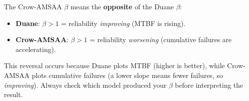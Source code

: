 \documentclass[
  letterpaper,
  DIV=11,
  numbers=noendperiod]{scrreprt}
\providecommand{\tightlist}{%
  \setlength{\itemsep}{0pt}\setlength{\parskip}{0pt}}
\begin{document}
\begin{tcolorbox}[enhanced jigsaw, arc=.35mm, bottomrule=.15mm, bottomtitle=1mm, breakable, colback=white, colbacktitle=quarto-callout-warning-color!10!white, colframe=quarto-callout-warning-color-frame, coltitle=black, left=2mm, leftrule=.75mm, opacityback=0, opacitybacktitle=0.6, rightrule=.15mm, title=\textcolor{quarto-callout-warning-color}{\faExclamationTriangle}\hspace{0.5em}{β Interpretation is Reversed Between Models}, titlerule=0mm, toprule=.15mm, toptitle=1mm]

The Crow-AMSAA \(\beta\) means the \textbf{opposite} of the Duane
\(\beta\):

\begin{itemize}
\tightlist
\item
  \textbf{Duane}: \(\beta > 1\) = reliability \emph{improving} (MTBF is
  rising).
\item
  \textbf{Crow-AMSAA}: \(\beta > 1\) = reliability \emph{worsening}
  (cumulative failures are accelerating).
\end{itemize}

This reversal occurs because Duane plots MTBF (higher is better), while
Crow-AMSAA plots cumulative failures (a lower slope means fewer
failures, so \emph{improving}). Always check which model produced your
\(\beta\) before interpreting the result.

\end{tcolorbox}
\end{document}
